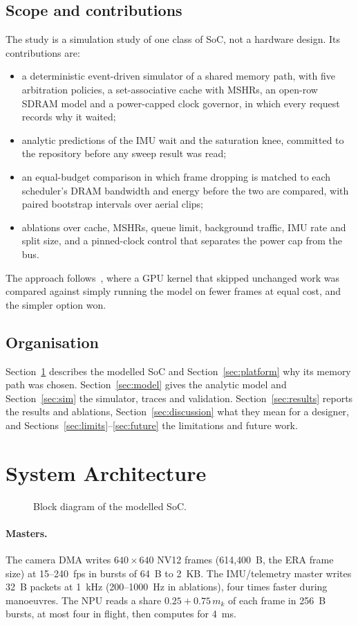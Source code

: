 \documentclass[11pt,a4paper]{article}
\begin{document}
\subsection{Scope and contributions}
The study is a simulation study of one class of SoC, not a hardware design. Its contributions are:
\begin{itemize}
\item a deterministic event-driven simulator of a shared memory path, with five arbitration policies, a set-associative cache with MSHRs, an open-row SDRAM model and a power-capped clock governor, in which every request records why it waited;
\item analytic predictions of the IMU wait and the saturation knee, committed to the repository before any sweep result was read;
\item an equal-budget comparison in which frame dropping is matched to each scheduler's DRAM bandwidth and energy before the two are compared, with paired bootstrap intervals over \nClips{} aerial clips;
\item ablations over cache, MSHRs, queue limit, background traffic, IMU rate and split size, and a pinned-clock control that separates the power cap from the bus.
\end{itemize}
The approach follows~\cite{baig2026fewer}, where a GPU kernel that skipped unchanged work was compared against simply running the model on fewer frames at equal cost, and the simpler option won.

\subsection{Organisation}
Section~\ref{sec:arch} describes the modelled SoC and Section~\ref{sec:platform} why its memory path was chosen. Section~\ref{sec:model} gives the analytic model and Section~\ref{sec:sim} the simulator, traces and validation. Section~\ref{sec:results} reports the results and ablations, Section~\ref{sec:discussion} what they mean for a designer, and Sections~\ref{sec:limits}--\ref{sec:future} the limitations and future work.

\section{System Architecture}\label{sec:arch}
\begin{figure}[h]\centering\caption{Block diagram of the modelled SoC.}\end{figure}
\paragraph{Masters.} The camera DMA writes $640\times640$ NV12 frames (614{,}400~B, the ERA frame size) at 15--240~fps in bursts of 64~B to 2~KB. The IMU/telemetry master writes 32~B packets at 1~kHz (200--1000~Hz in ablations), four times faster during manoeuvres. The NPU reads a share $0.25+0.75\,m_k$ of each frame in 256~B bursts, at most four in flight, then computes for 4~ms.
\end{document}
